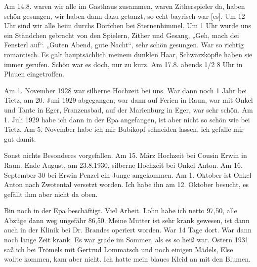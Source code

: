 \documentclass[a5paper,11pt,openany]{book}
\newcommand{\seite}[1]{\leavevmode\marginpar{\footnotesize\itshape\raggedright #1}\ignorespaces}
\newcommand{\jahr}[1]{\par\medskip\noindent{\scshape #1}\par\nopagebreak}
\begin{document}
\seite{10}
Am 14.8. waren wir alle im Gasthaus zusammen, waren Zitherspieler da,
  haben schön gesungen, wir haben dann dazu getanzt, so echt bayrisch war [es].
Um 12 Uhr sind wir alle heim durchs Dörfchen bei Sternenhimmel.
Um 1 Uhr wurde uns ein Ständchen gebracht von den Spielern, Zither und Gesang, „Geh, mach dei Fensterl auf“.
„Guten Abend, gute Nacht“, sehr schön gesungen.
War so richtig romantisch.
Es galt hauptsächlich meinem dunklen Haar, Schwarzköpfle haben sie immer gerufen.
Schön war es doch, nur zu kurz.
Am 17.8. abends 1/2 8 Uhr in Plauen eingetroffen.

\seite{11}
Am 1. November 1928 war silberne Hochzeit bei uns.
War dann noch 1 Jahr bei Tietz, am 20. Juni 1929 abgegangen, war dann auf Ferien in Raun,
  war mit Onkel und Tante in Eger, Franzensbad, auf der Marienburg in Eger, war sehr schön.
Am 1. Juli 1929 habe ich dann in der Epa angefangen, ist aber nicht so schön wie bei Tietz.
Am 5. November habe ich mir Bubikopf schneiden lassen, ich gefalle mir gut damit.

\jahr{Jahr 1930.}
\seite{12}
Sonst nichts Besonderes vorgefallen.
Am 15. März Hochzeit bei Cousin Erwin in Raun.
Ende August, am 23.8.1930, silberne Hochzeit bei Onkel Anton.
Am 16. September 30 bei Erwin Penzel ein Junge angekommen.
Am 1. Oktober ist Onkel Anton nach Zwotental versetzt worden.
Ich habe ihn am 12. Oktober besucht, es gefällt ihm aber nicht da oben.

\jahr{Jahr 1931.}
\seite{13}
Bin noch in der Epa beschäftigt.
Viel Arbeit.
Lohn habe ich netto 97,50, alle Abzüge dann weg ungefähr 86,50.
Meine Mutter ist sehr krank gewesen, ist dann auch in der Klinik bei Dr. Brandes operiert worden.
War 14 Tage dort.
War dann noch lange Zeit krank.
Es war grade im Sommer, als es so heiß war.
Ostern 1931 saß ich bei Trömels mit Gertrud Lommatsch und noch einigen Mädels, Else wollte kommen, kam aber nicht.
Ich hatte mein blaues Kleid an mit den Blumen.
\end{document}
